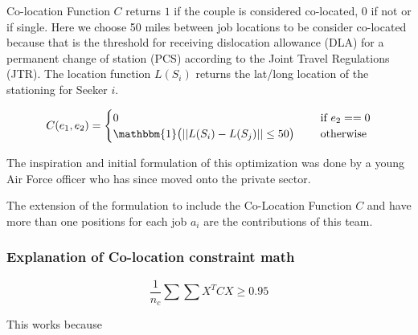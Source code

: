 Co-location Function $C$ returns $1$ if the couple is considered co-located, 0 if not or if single. Here we choose 50 miles between job locations to be consider co-located because that is the threshold for receiving dislocation allowance (DLA) for a permanent change of station (PCS) according to the Joint Travel Regulations (JTR). The location function $L(S_i)$ returns the lat/long location of the stationing for Seeker $i$. 

\[C(e_1,e_2) = \begin{cases}
0 \quad & \text{ if } e_2 == 0 \\
 \mathbbm{1}\big( || L(S_i) - L(S_j) || \leq 50 \big) \quad & \text{ otherwise }
 \end{cases}\]


The inspiration and initial formulation of this optimization was done by a young Air Force officer who has since moved onto the private sector. 

The extension of the formulation to include the Co-Location Function $C$ and have more than one positions for each job $a_i$ are the contributions of this team. 

\subsubsection{Explanation of Co-location constraint math}

 \[\frac{1}{n_c} \sum \sum X^TCX \geq 0.95\]

 This works because

